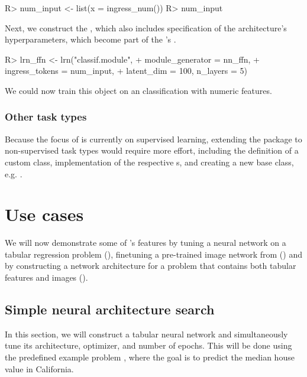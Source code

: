 \documentclass[article]{jss}
\theoremstyle{definition}
\begin{document}
\begin{CodeInput}
R> num_input <- list(x = ingress_num())
R> num_input
\end{CodeInput}


Next, we construct the , which also includes specification of the architecture's hyperparameters, which become part of the 's .

\begin{CodeInput}
R> lrn_ffn <- lrn("classif.module",
+    module_generator = nn_ffn,
+    ingress_tokens = num_input,
+    latent_dim = 100, n_layers = 5)
\end{CodeInput}

We could now train this object on an \mlrt{} classification  with numeric features.

\subsubsection{Other task types}

Because the focus of  is currently on supervised learning, extending the package to non-supervised task types would require more effort, including the definition of a custom  class, implementation of the respective s, and creating a new base class, e.g. .

\section{Use cases}\label{sec:use-cases}

We will now demonstrate some of 's features by tuning a neural network on a tabular regression problem (), finetuning a pre-trained image network from  () and by constructing a network architecture for a problem that contains both tabular features and images ().

\subsection{Simple neural architecture search}\label{sec:tuning}

In this section, we will construct a tabular neural network and simultaneously tune its architecture, optimizer, and number of epochs.
This will be done using the predefined  example problem \citep{ref-pace1997sparse}, where the goal is to predict the median house value in California.
\end{document}
